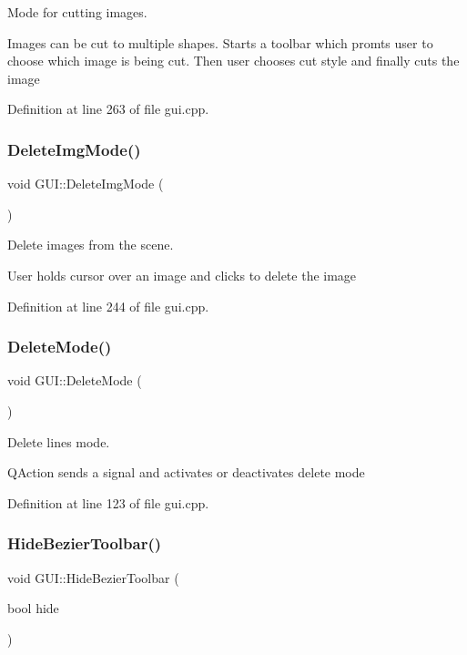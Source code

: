Mode for cutting images. 

Images can be cut to multiple shapes. Starts a toolbar which promts user to choose which image is being cut. Then user chooses cut style and finally cuts the image 

Definition at line 263 of file gui.\+cpp.

\mbox{\label{classGUI_a453b758a292b4a0e6f52f25b1bb2de77}} 
\subsubsection{\texorpdfstring{Delete\+Img\+Mode()}{DeleteImgMode()}}
{\footnotesize\ttfamily void G\+U\+I\+::\+Delete\+Img\+Mode (\begin{DoxyParamCaption}{ }\end{DoxyParamCaption})}



Delete images from the scene. 

User holds cursor over an image and clicks to delete the image 

Definition at line 244 of file gui.\+cpp.

\mbox{\label{classGUI_aac66154aaa763aac4d20e55cbd1bdc0d}} 
\subsubsection{\texorpdfstring{Delete\+Mode()}{DeleteMode()}}
{\footnotesize\ttfamily void G\+U\+I\+::\+Delete\+Mode (\begin{DoxyParamCaption}{ }\end{DoxyParamCaption})}



Delete lines mode. 

Q\+Action sends a signal and activates or deactivates delete mode 

Definition at line 123 of file gui.\+cpp.

\mbox{\label{classGUI_ae36c91ff70502eeecb985c3b84aa3a07}} 
\subsubsection{\texorpdfstring{Hide\+Bezier\+Toolbar()}{HideBezierToolbar()}}
{\footnotesize\ttfamily void G\+U\+I\+::\+Hide\+Bezier\+Toolbar (\begin{DoxyParamCaption}\item[{bool}]{hide }\end{DoxyParamCaption})}



